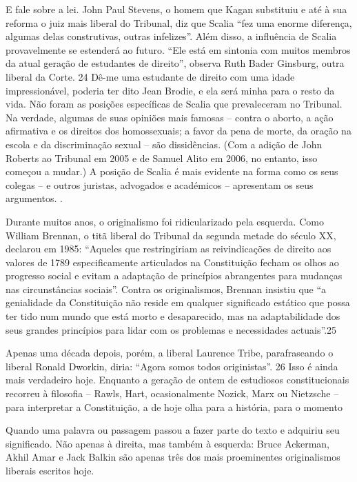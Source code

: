  \par 
E fale sobre a lei. John Paul Stevens, o homem que Kagan substituiu e até à sua reforma o juiz mais liberal do Tribunal, diz que Scalia “fez uma enorme diferença, algumas delas construtivas, outras infelizes”. Além disso, a influência de Scalia provavelmente se estenderá ao futuro. “Ele está em sintonia com muitos membros da atual geração de estudantes de direito”, observa Ruth Bader Ginsburg, outra liberal da Corte. {\color{blue}24} Dê-me uma estudante de direito com uma idade impressionável, poderia ter dito Jean Brodie, e ela será minha para o resto da vida. Não foram as posições específicas de Scalia que prevaleceram no Tribunal. Na verdade, algumas de suas opiniões mais famosas – contra o aborto, a ação afirmativa e os direitos dos homossexuais; a favor da pena de morte, da oração na escola e da discriminação sexual – são dissidências. (Com a adição de John Roberts ao Tribunal em 2005 e de Samuel Alito em 2006, no entanto, isso começou a mudar.) A posição de Scalia é mais evidente na forma como os seus colegas – e outros juristas, advogados e académicos – apresentam os seus argumentos. .
 \par 
Durante muitos anos, o originalismo foi ridicularizado pela esquerda. Como William Brennan, o titã liberal do Tribunal da segunda metade do século XX, declarou em 1985: “Aqueles que restringiriam as reivindicações de direito aos valores de 1789 especificamente articulados na Constituição fecham os olhos ao progresso social e evitam a adaptação de princípios abrangentes para mudanças nas circunstâncias sociais”. Contra os originalismos, Brennan insistiu que “a genialidade da Constituição não reside em qualquer significado estático que possa ter tido num mundo que está morto e desaparecido, mas na adaptabilidade dos seus grandes princípios para lidar com os problemas e necessidades actuais”.{\color{blue}25}
 \par 
Apenas uma década depois, porém, a liberal Laurence Tribe, parafraseando o liberal Ronald Dworkin, diria: “Agora somos todos originistas”. {\color{blue}26} Isso é ainda mais verdadeiro hoje. Enquanto a geração de ontem de estudiosos constitucionais recorreu à filosofia – Rawls, Hart, ocasionalmente Nozick, Marx ou Nietzsche – para interpretar a Constituição, a de hoje olha para a história, para o momento
 \par 
Quando uma palavra ou passagem passou a fazer parte do texto e adquiriu seu significado. Não apenas à direita, mas também à esquerda: Bruce Ackerman, Akhil Amar e Jack Balkin são apenas três dos mais proeminentes originalismos liberais escritos hoje.

